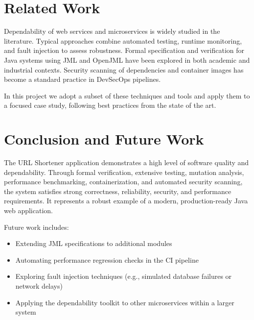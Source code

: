 \documentclass[sigconf]{acmart}
\begin{document}
\section{Related Work}
Dependability of web services and microservices is widely studied in the literature. Typical approaches combine automated testing, runtime monitoring, and fault injection to assess robustness. Formal specification and verification for Java systems using JML and OpenJML have been explored in both academic and industrial contexts. Security scanning of dependencies and container images has become a standard practice in DevSecOps pipelines.

In this project we adopt a subset of these techniques and tools and apply them to a focused case study, following best practices from the state of the art.

\section{Conclusion and Future Work}
The URL Shortener application demonstrates a high level of software quality and dependability. Through formal verification, extensive testing, mutation analysis, performance benchmarking, containerization, and automated security scanning, the system satisfies strong correctness, reliability, security, and performance requirements. It represents a robust example of a modern, production-ready Java web application.

Future work includes:
\begin{itemize}
  \item Extending JML specifications to additional modules
  \item Automating performance regression checks in the CI pipeline
  \item Exploring fault injection techniques (e.g., simulated database failures or network delays)
  \item Applying the dependability toolkit to other microservices within a larger system
\end{itemize}



\end{document}
